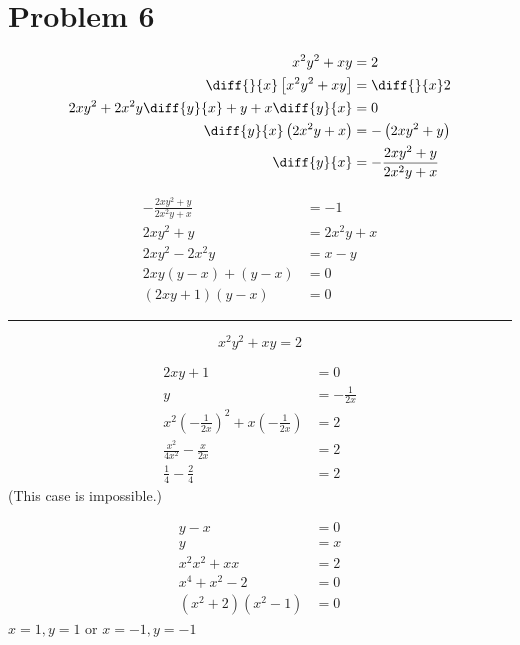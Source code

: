 \documentclass{article}
\begin{document}
\section*{Problem 6}
\centering
\begin{minipage}[t]{0.45\linewidth}
\begin{align*}
	x^2y^2+xy&=2 \\
	\diff{}{x}\left[x^2y^2+xy\right]&=\diff{}{x}2 \\
	2xy^2+2x^2y\diff{y}{x}+y+x\diff{y}{x}&=0 \\
	\diff{y}{x}\left(2x^2y+x\right)&=-\left(2xy^2+y\right) \\
	\diff{y}{x}&=-\frac{2xy^2+y}{2x^2y+x}
\end{align*}
\end{minipage}
\begin{minipage}[t]{0.4\linewidth}
\begin{align*}
	-\frac{2xy^2+y}{2x^2y+x}&=-1 \\
	2xy^2+y&=2x^2y+x \\
	2xy^2-2x^2y&=x-y \\
	2xy(y-x)+(y-x)&=0\\
	(2xy+1)(y-x)&=0
\end{align*}
\end{minipage}
\vspace*{8pt}
\par\noindent\rule{\linewidth}{0.5pt}
\begin{equation*}
	x^2y^2+xy=2
\end{equation*}
\begin{minipage}[t]{0.4\linewidth}
	\setlength{\abovedisplayskip}{0pt}
	\begin{align*}
		2xy+1&=0 \\
		y&=-\frac{1}{2x} \\
		x^2\left(-\frac{1}{2x}\right)^2+x\left(-\frac{1}{2x}\right)&=2 \\
		\frac{x^2}{4x^2}-\frac{x}{2x}&=2 \\
		\frac{1}{4}-\frac{2}{4}&=2
	\end{align*}
	(This case is impossible.)
\end{minipage}
\begin{minipage}[t]{0.4\linewidth}
	\setlength{\abovedisplayskip}{0pt}
	\begin{align*}
		y-x&=0 \\
		y&=x \\
		x^2x^2+xx&=2 \\
		x^4+x^2-2&=0 \\
		(x^2+2)(x^2-1)&=0
	\end{align*}
	\centering
	$x=1,y=1$ or $x=-1,y=-1$
	\linebreak
	\linebreak
\end{minipage}
\flushleft
\end{document}
